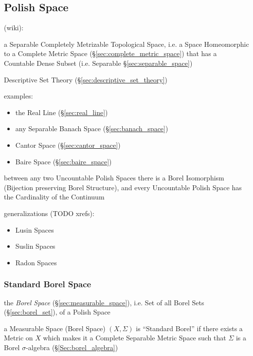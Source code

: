 \subsection{Polish Space}\label{sec:polish_space}

(wiki):

a Separable Completely Metrizable Topological Space, i.e. a Space Homeomorphic
to a Complete Metric Space (\S\ref{sec:complete_metric_space}) that has a
Countable Dense Subset (i.e. Separable \S\ref{sec:separable_space})

\fist Descriptive Set Theory (\S\ref{sec:descriptive_set_theory})

examples:
\begin{itemize}
  \item the Real Line (\S\ref{sec:real_line})
  \item any Separable Banach Space (\S\ref{sec:banach_space})
  \item Cantor Space (\S\ref{sec:cantor_space})
  \item Baire Space (\S\ref{sec:baire_space})
\end{itemize}

between any two Uncountable Polish Spaces there is a Borel Isomorphism
(Bijection preserving Borel Structure), and every Uncountable Polish Space has
the Cardinality of the Continuum

generalizations (TODO xrefs):
\begin{itemize}
  \item Lusin Spaces
  \item Suslin Spaces
  \item Radon Spaces
\end{itemize}



\subsubsection{Standard Borel Space}\label{sec:standard_borel_space}

the \emph{Borel Space} (\S\ref{sec:measurable_space}), i.e. Set of all Borel
Sets (\S\ref{sec:borel_set}), of a Polish Space

a Measurable Space (Borel Space) $(X, \Sigma)$ is ``Standard Borel'' if there
exists a Metric on $X$ which makes it a Complete Separable Metric Space such
that $\Sigma$ is a Borel $\sigma$-algebra (\S\ref{Sec:borel_algebra})

